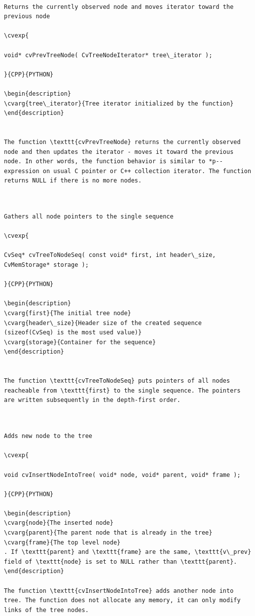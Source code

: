 \begin{verbatim}

Returns the currently observed node and moves iterator toward the previous node

\cvexp{

void* cvPrevTreeNode( CvTreeNodeIterator* tree\_iterator );

}{CPP}{PYTHON}

\begin{description}
\cvarg{tree\_iterator}{Tree iterator initialized by the function}
\end{description}


The function \texttt{cvPrevTreeNode} returns the currently observed node and then updates the iterator - moves it toward the previous node. In other words, the function behavior is similar to *p-- expression on usual C pointer or C++ collection iterator. The function returns NULL if there is no more nodes.


\end{verbatim}
\label{TreeToNodeSeq}
\begin{verbatim}

Gathers all node pointers to the single sequence

\cvexp{

CvSeq* cvTreeToNodeSeq( const void* first, int header\_size, CvMemStorage* storage );

}{CPP}{PYTHON}

\begin{description}
\cvarg{first}{The initial tree node}
\cvarg{header\_size}{Header size of the created sequence (sizeof(CvSeq) is the most used value)}
\cvarg{storage}{Container for the sequence}
\end{description}


The function \texttt{cvTreeToNodeSeq} puts pointers of all nodes reacheable from \texttt{first} to the single sequence. The pointers are written subsequently in the depth-first order.


\end{verbatim}
\label{InsertNodeIntoTree}
\begin{verbatim}

Adds new node to the tree

\cvexp{

void cvInsertNodeIntoTree( void* node, void* parent, void* frame );

}{CPP}{PYTHON}

\begin{description}
\cvarg{node}{The inserted node}
\cvarg{parent}{The parent node that is already in the tree}
\cvarg{frame}{The top level node}
. If \texttt{parent} and \texttt{frame} are the same, \texttt{v\_prev} field of \texttt{node} is set to NULL rather than \texttt{parent}.
\end{description}

The function \texttt{cvInsertNodeIntoTree} adds another node into tree. The function does not allocate any memory, it can only modify links of the tree nodes.


\end{verbatim}
